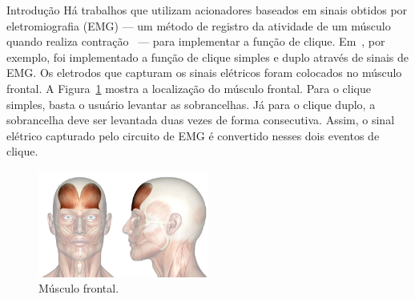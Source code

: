 \begin{chapter}{Introdução}
Há trabalhos que utilizam acionadores baseados em sinais obtidos por
eletromiografia (EMG) --- um método de registro da atividade de um músculo quando
realiza contração~\cite{Amadio07} --- para implementar a função de clique.
Em~\cite{Pinheiro12}, por exemplo, foi implementado a função de clique simples e
duplo através de sinais de EMG. Os eletrodos que capturam os sinais elétricos
foram colocados no músculo frontal. A Figura~\ref{fig:frontal} mostra a
localização do músculo frontal. Para o clique simples, basta o usuário levantar
as sobrancelhas. Já para o clique duplo, a sobrancelha deve ser levantada duas
vezes de forma consecutiva. Assim, o sinal elétrico capturado pelo circuito de
EMG é convertido nesses dois eventos de clique.

\begin{figure}[!h]
	\centering
	\includegraphics[width=0.5\textwidth]{fig/frontal}
	\caption{Músculo frontal.}
	\label{fig:frontal}
\end{figure}


\end{chapter}
